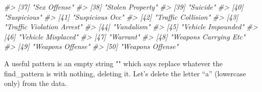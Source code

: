 \documentclass[
  12pt,
]{book}
\newenvironment{Shaded}{\begin{snugshade}}{\end{snugshade}}
\newcommand{\CommentTok}[1]{\textcolor[rgb]{0.56,0.35,0.01}{\textit{#1}}}
\begin{document}
\begin{Shaded}
\begin{Highlighting}[]
\CommentTok{\#> [37] "Sex Offense"                               }
\CommentTok{\#> [38] "Stolen Property"                           }
\CommentTok{\#> [39] "Suicide"                                   }
\CommentTok{\#> [40] "Suspicious"                                }
\CommentTok{\#> [41] "Suspicious Occ"                            }
\CommentTok{\#> [42] "Traffic Collision"                         }
\CommentTok{\#> [43] "Traffic Violation Arrest"                  }
\CommentTok{\#> [44] "Vandalism"                                 }
\CommentTok{\#> [45] "Vehicle Impounded"                         }
\CommentTok{\#> [46] "Vehicle Misplaced"                         }
\CommentTok{\#> [47] "Warrant"                                   }
\CommentTok{\#> [48] "Weapons Carrying Etc"                      }
\CommentTok{\#> [49] "Weapons Offense"                           }
\CommentTok{\#> [50] "Weapons Offense"}
\end{Highlighting}
\end{Shaded}

A useful pattern is an empty string "" which says replace whatever the find\_pattern is with nothing, deleting it. Let's delete the letter ``a'' (lowercase only) from the data.
\end{document}
